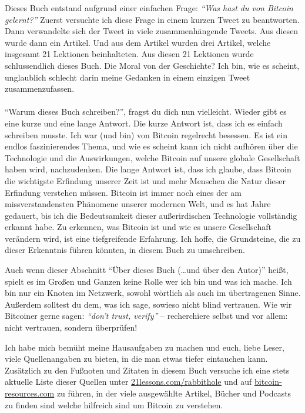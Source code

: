 Dieses Buch entstand aufgrund einer einfachen Frage: \textit{\enquote{Was hast
du von Bitcoin gelernt?}} Zuerst versuchte ich diese Frage in einem kurzen Tweet
zu beantworten. Dann verwandelte sich der Tweet in viele zusammenhängende
Tweets. Aus diesen wurde dann ein Artikel. Und aus dem Artikel wurden drei
Artikel, welche insgesamt 21 Lektionen beinhalteten. Aus diesen 21 Lektionen
wurde schlussendlich dieses Buch. Die Moral von der Geschichte? Ich bin, wie es
scheint,  unglaublich schlecht darin meine Gedanken in einem einzigen Tweet
zusammenzufassen.

\paragraph{}
\enquote{Warum dieses Buch schreiben?}, fragst du dich nun vielleicht. Wieder
gibt es eine kurze und eine lange Antwort. Die kurze Antwort ist, dass ich es
einfach schreiben musste. Ich war (und bin) von Bitcoin regelrecht besessen. Es
ist ein endlos faszinierendes Thema, und wie es scheint kann ich nicht aufhören
über die Technologie und die Auswirkungen, welche Bitcoin auf unsere globale
Gesellschaft haben wird, nachzudenken. Die lange Antwort ist, dass ich glaube,
dass Bitcoin die wichtigste Erfindung unserer Zeit ist und mehr Menschen die
Natur dieser Erfindung verstehen müssen. Bitcoin ist immer noch eines der am
missverstandensten Phänomene unserer modernen Welt, und es hat Jahre
gedauert, bis ich die Bedeutsamkeit dieser außerirdischen Technologie vollständig
erkannt habe. Zu erkennen, was Bitcoin ist und wie es unsere Gesellschaft
verändern wird, ist eine tiefgreifende Erfahrung. Ich hoffe, die Grundsteine, die zu
dieser Erkenntnis führen könnten, in diesem Buch zu umschreiben.

Auch wenn dieser Abschnitt \enquote{Über dieses Buch (\ldots und über den
Autor)} heißt, spielt es im Großen und Ganzen keine Rolle wer ich bin und was
ich mache. Ich bin nur ein Knoten im Netzwerk, sowohl wörtlich als auch im
übertragenen Sinne. Außerdem solltest du dem, was ich sage, sowieso nicht blind
vertrauen. Wie wir Bitcoiner gerne sagen: \textit{\enquote{don't trust, verify}}
-- recherchiere selbst und vor allem: nicht vertrauen, sondern überprüfen!

Ich habe mich bemüht meine Hausaufgaben zu machen und euch, liebe Leser, viele
Quellenangaben zu bieten, in die man etwas tiefer eintauchen kann. Zusätzlich zu
den Fußnoten und Zitaten in diesem Buch versuche ich eine stets aktuelle Liste
dieser Quellen unter
\href{https://21lessons.com/rabbithole}{21lessons.com/rabbithole} und auf
\href{https://bitcoin-resources.com}{bitcoin-resources.com} zu führen, in der
viele ausgewählte Artikel, Bücher und Podcasts zu finden sind welche hilfreich
sind um Bitcoin zu verstehen.


